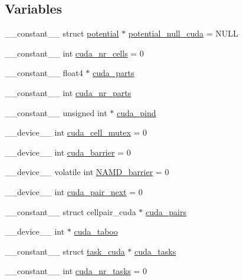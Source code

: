 \subsection*{Variables}
\begin{DoxyCompactItemize}
\item 
\-\_\-\-\_\-constant\-\_\-\-\_\- struct \hyperlink{structpotential}{potential} $\ast$ \hyperlink{runner__cuda_8cu_a4f0b849536c8706d83970da4de5dbba5}{potential\-\_\-null\-\_\-cuda} = N\-U\-L\-L
\item 
\-\_\-\-\_\-constant\-\_\-\-\_\- int \hyperlink{runner__cuda_8cu_a6702eee3500e190b55a613b7fef9ec47}{cuda\-\_\-nr\-\_\-cells} = 0
\item 
\-\_\-\-\_\-constant\-\_\-\-\_\- float4 $\ast$ \hyperlink{runner__cuda_8cu_ac58ae810788e08dcbd4eef99b70053b9}{cuda\-\_\-parts}
\item 
\-\_\-\-\_\-constant\-\_\-\-\_\- int \hyperlink{runner__cuda_8cu_acef4db95588c53945d1d78c666f5b002}{cuda\-\_\-nr\-\_\-parts}
\item 
\-\_\-\-\_\-constant\-\_\-\-\_\- unsigned int $\ast$ \hyperlink{runner__cuda_8cu_a88d83370f6fd3c3e2f491b487471e630}{cuda\-\_\-pind}
\item 
\-\_\-\-\_\-device\-\_\-\-\_\- int \hyperlink{runner__cuda_8cu_a8c78226a6267a5d427d17a6a505fc8b3}{cuda\-\_\-cell\-\_\-mutex} = 0
\item 
\-\_\-\-\_\-device\-\_\-\-\_\- int \hyperlink{runner__cuda_8cu_a329318e5b37cb5b963996d4ed945cbf8}{cuda\-\_\-barrier} = 0
\item 
\-\_\-\-\_\-device\-\_\-\-\_\- volatile int \hyperlink{runner__cuda_8cu_af9bd293eee8e022bec689d20692b967b}{N\-A\-M\-D\-\_\-barrier} = 0
\item 
\-\_\-\-\_\-device\-\_\-\-\_\- int \hyperlink{runner__cuda_8cu_ac7e0a2e211db72c23b66ea880dd3a9ec}{cuda\-\_\-pair\-\_\-next} = 0
\item 
\-\_\-\-\_\-constant\-\_\-\-\_\- struct cellpair\-\_\-cuda $\ast$ \hyperlink{runner__cuda_8cu_afc0b6fa07354e6cf17317b112ec1090e}{cuda\-\_\-pairs}
\item 
\-\_\-\-\_\-device\-\_\-\-\_\- int $\ast$ \hyperlink{runner__cuda_8cu_aa0b6600f0328ae28392b5ac1b928433a}{cuda\-\_\-taboo}
\item 
\-\_\-\-\_\-constant\-\_\-\-\_\- struct \hyperlink{structtask__cuda}{task\-\_\-cuda} $\ast$ \hyperlink{runner__cuda_8cu_aaa757a57fa1ece5a1cadbce0c44836b4}{cuda\-\_\-tasks}
\item 
\-\_\-\-\_\-constant\-\_\-\-\_\- int \hyperlink{runner__cuda_8cu_aa43645dc9edd3b54c32b838f09b4c0c1}{cuda\-\_\-nr\-\_\-tasks} = 0

\end{DoxyCompactItemize}
